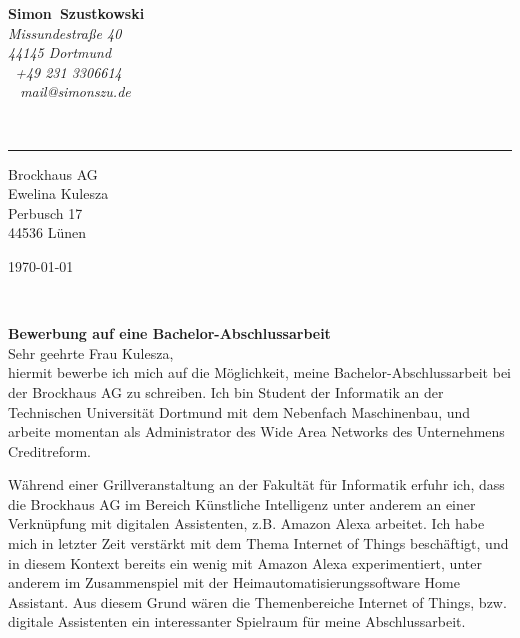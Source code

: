 \documentclass[11pt,a4paper]{article}
\def\firstname{Simon}
\def\familyname{Szustkowski}
\begin{document}
\sffamily   %
\hfill%
\begin{minipage}[t]{.6\textwidth}
	\raggedleft%
	{\bfseries {\color{firstnamecolor}\firstname}~{\color{familynamecolor}\familyname}}\\[.35ex]
	\small\itshape%
	Missundestraße 40\\
	44145 Dortmund\\[.35ex]
	\Mobilefone~+49 231 3306614\\
	\Letter~ mail@simonszu.de
\end{minipage}\\[0.5em]
%
{\color{firstnamecolor}\rule{\textwidth}{.25ex}}
%
\begin{minipage}[t]{.4\textwidth}
	\raggedright%
	\vspace*{1em}
	Brockhaus AG\\[.35ex]
	\small%
	Ewelina Kulesza\\
	Perbusch 17\\
	44536 Lünen
\end{minipage}
%
\hfill
%
\begin{minipage}[t]{.4\textwidth}
	\raggedleft %
	\today
\end{minipage}\\[1em]
\raggedright

{\bfseries \color{familynamecolor}Bewerbung auf eine Bachelor-Abschlussarbeit}\\[1.5em]

Sehr geehrte Frau Kulesza,\\[1em]
%
hiermit bewerbe ich mich auf die Möglichkeit, meine Bachelor-Abschlussarbeit bei der Brockhaus AG zu schreiben. Ich bin Student der Informatik an der Technischen Universität Dortmund mit dem Nebenfach Maschinenbau, und arbeite momentan als Administrator des Wide Area Networks des Unternehmens Creditreform.\par

Während einer Grillveranstaltung an der Fakultät für Informatik erfuhr ich, dass die Brockhaus AG im Bereich Künstliche Intelligenz unter anderem an einer Verknüpfung mit digitalen Assistenten, z.B. Amazon Alexa arbeitet. Ich habe mich in letzter Zeit verstärkt mit dem Thema \glqq Internet of Things\grqq{} beschäftigt, und in diesem Kontext bereits ein wenig mit Amazon Alexa experimentiert, unter anderem im Zusammenspiel mit der Heimautomatisierungssoftware \glqq Home Assistant\grqq. Aus diesem Grund wären die Themenbereiche Internet of Things, bzw. digitale Assistenten ein interessanter Spielraum für meine Abschlussarbeit.  
\end{document}
